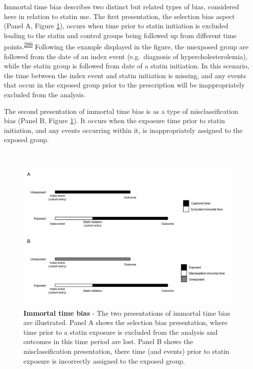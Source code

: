 \documentclass[a4paper, twoside]{templates/ociamthesis}
\begin{document}
Immortal time bias describes two distinct but related types of bias, considered here in relation to statin use. The first presentation, the selection bias aspect (Panel A, Figure \ref{fig:immortalTimeBias}), occurs when time prior to statin initiation is excluded leading to the statin and control groups being followed up from different time points.\textsuperscript{\protect\hyperlink{ref-levesque2010}{299}} Following the example displayed in the figure, the unexposed group are followed from the date of an index event (e.g.~diagnosis of hypercholesterolemia), while the statin group is followed from date of a statin initiation. In this scenario, the time between the index event and statin initiation is missing, and any events that occur in the exposed group prior to the prescription will be inappropriately excluded from the analysis.

The second presentation of immortal time bias is as a type of misclassification bias (Panel B, Figure \ref{fig:immortalTimeBias}). It occurs when the exposure time prior to statin initiation, and any events occurring within it, is inappropriately assigned to the exposed group.

~





\begin{figure}[H]
\includegraphics[width=1\linewidth]{figures/cprd-analysis/immortal_time} \caption[Immortal time bias]{\textbf{Immortal time bias} - The two presentations of immortal time bias are illustrated. Panel A shows the selection bias presentation, where time prior to a statin exposure is excluded from the analysis and outcomes in this time period are lost. Panel B shows the misclassification presentation, there time (and events) prior to statin exposure is incorrectly assigned to the exposed group.}\label{fig:immortalTimeBias}
\end{figure}
\end{document}
